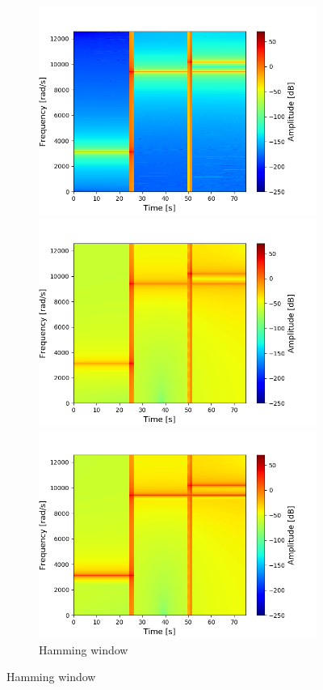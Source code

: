 \begin{figure}[H]
\centering
\begin{subfigure}{0.49\textwidth}
\centering

\includegraphics[width=\textwidth]{figures/stft_windows/hanning_10000.png}
\caption{Hanning window}
\label{fig:stft_hanning}
\includegraphics[width=\textwidth]{figures/stft_windows/hamming_10000.png}
\caption{Hamming window}
\label{fig:stft_hamming}
\includegraphics[width=\textwidth]{figures/stft_windows/kaiser/10000/4.png}

\end{subfigure}
\end{figure}
